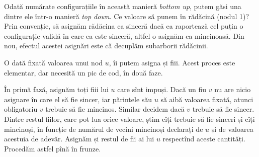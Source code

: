 \documentclass[../main.tex]{subfiles}
\begin{document}
Odată numărate configurațiile în această manieră \textit{bottom up}, putem găsi una dintre ele într-o manieră \textit{top down}. Ce valoare să punem în rădăcină (nodul 1)? Prin convenție, să asignăm rădăcina ca sinceră dacă ea raportează cel puțin o configurație validă în care ea este sinceră, altfel o asignăm ca mincinoasă. Din nou, efectul acestei asignări este că decuplăm subarborii rădăcinii.

O dată fixată valoarea unui nod $u$, îi putem asigna și fiii. Acest proces este elementar, dar necesită un pic de cod, în două faze.

În primă fază, asignăm toți fiii lui $u$ care sînt impuși. Dacă un fiu $v$ nu are nicio asignare în care el să fie sincer, iar părintele său $u$ să aibă valoarea fixată, atunci obligatoriu $v$ trebuie să fie mincinos. Similar decidem dacă $v$ trebuie să fie sincer. Dintre restul fiilor, care pot lua orice valoare, știm cîți trebuie să fie sinceri și cîți mincinoși, în funcție de numărul de vecini mincinoși declarați de $u$ și de valoarea acestuia de adevăr. Asignăm și restul de fii ai lui $u$ respectînd aceste cantități. Procedăm astfel pînă în frunze.
\end{document}
